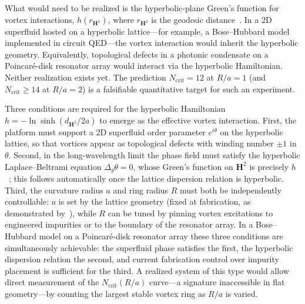 
What would need to be realized is the hyperbolic-plane Green's
function for vortex interactions, $h(r_{\mathbf{H}^2})$, where
$r_{\mathbf{H}^2}$ is the geodesic distance~\citep{Kimura1999}.
In a 2D superfluid hosted on a hyperbolic lattice---for example,
a Bose--Hubbard model implemented in circuit QED---the vortex
interaction would inherit the hyperbolic geometry.  Equivalently,
topological defects in a photonic condensate on a Poincar\'e-disk
resonator array would interact via the hyperbolic Hamiltonian.
Neither realization exists yet.  The prediction $N_{\mathrm{crit}} = 12$
at $R/a = 1$ (and $N_{\mathrm{crit}} \ge 14$ at $R/a = 2$) is
a falsifiable quantitative target for such an experiment.

Three conditions are required for the hyperbolic Hamiltonian
$h = -\ln\sinh(d_{\mathbf{H}^2}/2a)$ to emerge as the effective vortex
interaction.  First, the platform must support a 2D superfluid order
parameter $e^{i\theta}$ on the hyperbolic lattice, so that vortices
appear as topological defects with winding number $\pm 1$ in $\theta$.
Second, in the long-wavelength limit the phase field must satisfy the
hyperbolic Laplace--Beltrami equation $\Delta_g\theta = 0$, whose
Green's function on $\mathbf{H}^2$ is precisely $h$~\citep{Kimura1999};
this follows automatically once the lattice dispersion relation is
hyperbolic.  Third, the curvature radius $a$ and ring radius $R$ must
both be independently controllable: $a$ is set by the lattice geometry
(fixed at fabrication, as demonstrated by~\citealt{Kollar2019}),
while $R$ can be tuned by pinning vortex excitations to engineered
impurities or to the boundary of the resonator array.  In a
Bose--Hubbard model on a Poincar\'e-disk resonator array these three
conditions are simultaneously achievable: the superfluid phase
satisfies the first, the hyperbolic dispersion relation the second,
and current fabrication control over impurity placement is sufficient
for the third.  A realized system of this type would allow direct
measurement of the $N_{\mathrm{crit}}(R/a)$ curve---a signature
inaccessible in flat geometry---by counting the largest stable
vortex ring as $R/a$ is varied.
